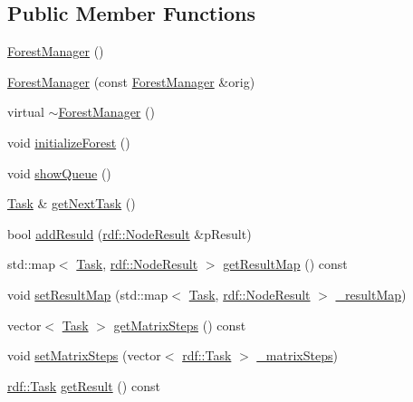 \subsection*{Public Member Functions}
\begin{DoxyCompactItemize}
\item 
\hyperlink{classrdf_1_1ForestManager_a91a1f9806518ed82227b382bc4427c56}{Forest\+Manager} ()
\item 
\hyperlink{classrdf_1_1ForestManager_a5ca6326452d58bd367459b00bf893eae}{Forest\+Manager} (const \hyperlink{classrdf_1_1ForestManager}{Forest\+Manager} \&orig)
\item 
virtual \hyperlink{classrdf_1_1ForestManager_a99e383aec1205f1f664047a9e6e22a10}{$\sim$\+Forest\+Manager} ()
\item 
void \hyperlink{classrdf_1_1ForestManager_abfc6d077d99b06b8d135d114f477ad5f}{initialize\+Forest} ()
\item 
void \hyperlink{classrdf_1_1ForestManager_af8975e5a2ea89cf3477241ebf7915ebe}{show\+Queue} ()
\item 
\hyperlink{classrdf_1_1Task}{Task} \& \hyperlink{classrdf_1_1ForestManager_a7531fb627d10ebcf471237449864317e}{get\+Next\+Task} ()
\item 
bool \hyperlink{classrdf_1_1ForestManager_a1399d029371b213523492ea8397199b6}{add\+Resuld} (\hyperlink{classrdf_1_1NodeResult}{rdf\+::\+Node\+Result} \&p\+Result)
\item 
std\+::map$<$ \hyperlink{classrdf_1_1Task}{Task}, \hyperlink{classrdf_1_1NodeResult}{rdf\+::\+Node\+Result} $>$ \hyperlink{classrdf_1_1ForestManager_aaacb6fcbb2b7a71f017fa49e4b0f813c}{get\+Result\+Map} () const 
\item 
void \hyperlink{classrdf_1_1ForestManager_ab88e04c863d4b6565670a65fe5b06435}{set\+Result\+Map} (std\+::map$<$ \hyperlink{classrdf_1_1Task}{Task}, \hyperlink{classrdf_1_1NodeResult}{rdf\+::\+Node\+Result} $>$ \hyperlink{classrdf_1_1ForestManager_ad764e01a338ea42ad8b2eaf360971875}{\+\_\+result\+Map})
\item 
vector$<$ \hyperlink{classrdf_1_1Task}{Task} $>$ \hyperlink{classrdf_1_1ForestManager_a6ff0f37f87dab897d449aa453e559926}{get\+Matrix\+Steps} () const 
\item 
void \hyperlink{classrdf_1_1ForestManager_a99315a804dfb3d3a70f0163eb9a245d8}{set\+Matrix\+Steps} (vector$<$ \hyperlink{classrdf_1_1Task}{rdf\+::\+Task} $>$ \hyperlink{classrdf_1_1ForestManager_a34fac652fc47cf8af5f7b292219d85ed}{\+\_\+matrix\+Steps})
\item 
\hyperlink{classrdf_1_1Task}{rdf\+::\+Task} \hyperlink{classrdf_1_1ForestManager_a6de8eeda582a53feee2127d1bf71b975}{get\+Result} () const 

\end{DoxyCompactItemize}
